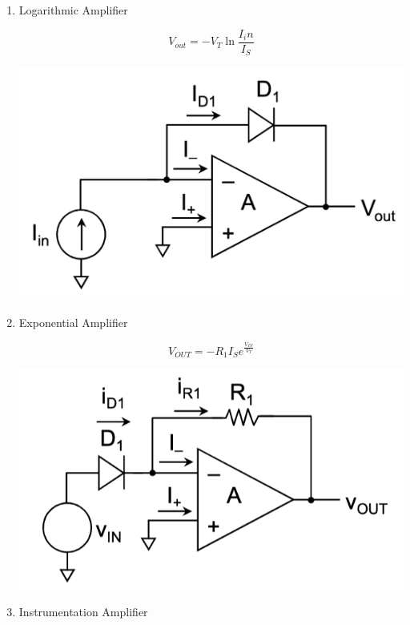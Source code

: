 \documentclass{article}
\begin{document}
\begin{enumerate}
\begin{minipage}{0.5\textwidth}
    \end{minipage}
    \item Logarithmic Amplifier \\
    \begin{minipage}{0.5\textwidth}
        \begin{equation}
        V_{out} = -V_T\ln{\frac{I_in}{I_S}}
    \end{equation}
    \end{minipage}
    \begin{minipage}{0.5\textwidth}
        \includegraphics[width=0.7\linewidth]{image/logamp.png}
    \end{minipage}
    \item Exponential Amplifier \\
    \begin{minipage}{0.5\textwidth}
        \begin{equation}
        V_{OUT} = -R_1I_Se^{\frac{V_{IN}}{V_T}}
    \end{equation}
    \end{minipage}
    \begin{minipage}{0.5\textwidth}
        \includegraphics[width=0.7\linewidth]{image/expamp.png}
    \end{minipage}
    \item Instrumentation Amplifier \\
    \begin{minipage}{0.5\textwidth}
        \begin{equation}

\end{equation}
\end{minipage}
\end{enumerate}
\end{document}

